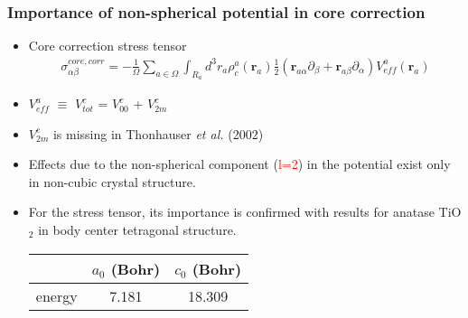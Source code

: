 \documentclass[10pt, handout]{beamer}
\newcommand{\nologo}{\setbeamertemplate{logo}{}}  %
\begin{document}
		
		{\nologo
			\begin{frame}
				\frametitle{Importance of non-spherical potential in core correction}
			\begin{small}				
				\begin{itemize}
					\item Core correction stress tensor 
					\begin{eqnarray}
						\sigma_{\alpha\beta}^{core,corr} =  -\frac{1}{\Omega} \sum_{a\in \Omega} \int_{{R_a}} d^3r_a \rho_c^a(\textbf{r}_a) \frac{1}{2} ( \textbf{r}_{a\alpha} \partial_\beta  + \textbf{r}_{a\beta} \partial_\alpha   ) V_{eff}^a(\textbf{r}_a)
					\end{eqnarray}
					\item $V^a_{eff}$ $\equiv$ $V_{tot}^{c}$ = $V_{00}^{c}$ + $V_{2m}^{c}$
					\item $V_{2m}^{c}$ is missing in Thonhauser \textit{et al.} (2002)
					\item Effects due to the non-spherical component (\textcolor{red}{l=2}) in the potential exist only in non-cubic crystal structure.
					\item For the stress tensor, its importance is confirmed with results for anatase TiO$_2$ in body center tetragonal structure.
					
					
					\begin{table}
						\begin{tabular}{c c c}
							\hline \hline
							& $a_0$ (Bohr) & $c_0$ (Bohr)    \\[0.5ex]
							\hline
							energy & 7.181 & 18.309  \\[1ex]
							

\end{tabular}
\end{table}
\end{itemize}
\end{small}
\end{frame}}
\end{document}
